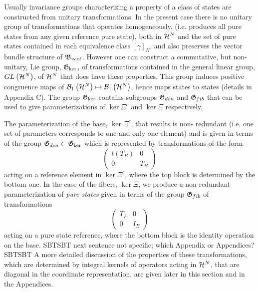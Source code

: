 Usually invariance groups characterizing a property of a class of states are
constructed from unitary transformations. In the present case there is no
unitary group of transformations that operates homogeneously, (i.e. produces
all pure states from any given reference pure state), both in ${\cal H}^{N}$
and the set of pure states contained in each equivalence class $\left[
\gamma \right] _{N}$, and also preserves the vector bundle structure of $%
{\frak B}_{vect}$. However one can construct a commutative, but non-unitary,
Lie group, ${\frak G}_{\ker }$, of transformations contained in the general
linear group, $GL\left( {\cal H}^{N}\right) $, of ${\cal H}^{N}$ that does
have these properties. This group induces positive congruence maps of ${\cal %
B}_{1}\left( {\cal H}^{N}\right) \mapsto {\cal B}_{1}\left( {\cal H}%
^{N}\right) $, hence maps states to states (details in Appendix C). The
group ${\frak G}_{\ker }$ contains subgroups ${\frak G}_{den}$ and ${\frak G}%
_{fib}$ that can be used to give parameterizations of $\ker \Xi ^{c}$ and $%
\ker \Xi $ respectively.

The parameterization of the base, $\ker \Xi ^{c}$, that results is non-
redundant (i.e. one set of parameters corresponds to one and only one
element) and is given in terms of the group ${\frak G}_{den}\subset {\frak G}%
_{\ker }$ which is represented by transformations of the form 
\begin{equation}
\left( 
\begin{array}{cc}
t\left( T_{B}\right) & 0 \\ 
0 & T_{B}%
\end{array}%
\right)
\end{equation}%
acting on a reference element in $\ker \Xi ^{c}$, where the top block is
determined by the bottom one. In the case of the fibers, $\ker \Xi $, we
produce a non-redundant parameterization of {\it pure states }given in terms
of the group ${\frak G}_{fib}$ of transformations 
\begin{equation}
\left( 
\begin{array}{cc}
T_{F} & 0 \\ 
0 & I_{B}%
\end{array}%
\right)
\end{equation}%
acting on a pure state reference, where the bottom block is the identity
operation on the base. SBTSBT next sentence not specific; which Appendix or
Appendices? SBTSBT A more detailed discussion of the properties of these
transformations, which are determined by integral kernels of operators
acting in ${\cal H}^{N}$, that are diagonal in the coordinate
representation, are given later in this section and in the Appendices.

